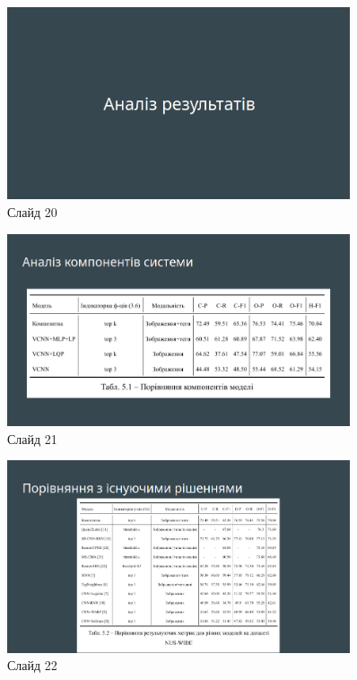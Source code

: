 \documentclass{udstu}
\begin{document}
\begin{figure}[!ht]
	\centering
	\includegraphics[width=0.9\textwidth]{PNG/present/present-20}
	\caption{Слайд 20}
\end{figure}

\begin{figure}[!ht]
	\centering
	\includegraphics[width=0.9\textwidth]{PNG/present/present-21}
	\caption{Слайд 21}
\end{figure}

\begin{figure}[!ht]
	\centering
	\includegraphics[width=0.9\textwidth]{PNG/present/present-22}
	\caption{Слайд 22}
\end{figure}
\end{document}
